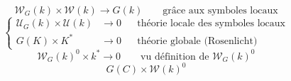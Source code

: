 \[
\mathscr W_G(k)\times\mathscr W(k)\longrightarrow G(k)\qquad\text{grâce aux symboles locaux}
\]
\[
\left\{\begin{aligned}
\mathscr U_G(k)\times\mathscr U(k)&\longrightarrow0&&\text{théorie locale des symboles locaux}\\
G(K)\times K^*&\longrightarrow0&&\text{théorie globale (Rosenlicht)}
\end{aligned}\right.
\]
\[
\mathscr W_G(k)^0\times k^*\longrightarrow0\qquad\text{vu définition de }\mathscr W_G(k)^0
\]
\[
G(C)\times\mathscr W(k)^0
\]
